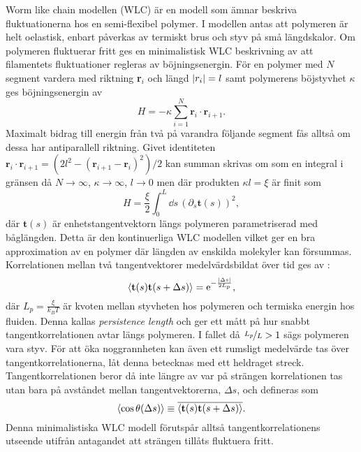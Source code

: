 Worm like chain modellen \cite{Milstein2013} (WLC) är en modell som ämnar beskriva fluktuationerna hos en semi-flexibel polymer. I modellen antas att polymeren är helt oelastisk, enbart påverkas av termiskt brus och styv på små längdskalor. Om polymeren fluktuerar fritt %
ges en minimalistisk WLC beskrivning av att filamentets fluktuationer regleras av böjningsenergin. För en polymer med $N$ segment vardera med riktning \textbf{r}$_i$ och längd $\abs{r_{i}}=l$ samt polymerens böjstyvhet $\kappa$ ges böjningsenergin av
\begin{equation}
    H = -\kappa\sum_{i=1}^{N}\textbf{r}_{i}\cdot \textbf{r}_{i+1}.
\end{equation}
Maximalt bidrag till energin från två på varandra följande segment fås alltså om dessa har antiparallell riktning. Givet identiteten $\textbf{r}_{i}\cdot\textbf{r}_{i+1}=(2l^2-(\textbf{r}_{i+1}-\textbf{r}_{i})^2)/2$ kan summan skrivas om som en integral i gränsen då $N \to \infty$, $\kappa\to\infty$, $l \to 0$ men där produkten $\kappa l=\xi$ är finit som 
\begin{equation}\label{böj}
    H=\frac{\xi}{2}\int_{0}^{L}\!\dd{s}\,(\partial_{s}\textbf{t}(s))^2,
\end{equation}
där $\textbf{t}(s)$ är enhetstangentvektorn längs polymeren parametriserad med båglängden. Detta är den kontinuerliga WLC modellen \cite{Fixman_WLC1973} vilket ger en bra approximation av en polymer där längden av enskilda molekyler kan försummas. Korrelationen mellan två tangentvektorer medelvärdsbildat över tid ges av \cite{Landau1958}:
\begin{equation}
\ev{\textbf{t}(s)\textbf{t}(s+\Delta s)}=\ee^{-\frac{\abs{\Delta s}}{2L_{p}}},
\end{equation}
där $L_{p}=\frac{\xi}{k_{B}T}$ är kvoten mellan styvheten hos polymeren och termiska energin hos fluiden. Denna kallas \emph{persistence length} och ger ett mått på hur snabbt tangentkorrelationen avtar längs polymeren. I fallet då $\nicefrac{L_{p}}{L}>1$ sägs polymeren vara styv. 
För att öka noggrannheten kan även ett rumsligt medelvärde tas över tangentkorrelationerna, låt denna betecknas med ett heldraget streck. Tangentkorrelationen beror då inte längre av var på strängen korrelationen tas utan bara på avståndet mellan tangentvektorerna, $\Delta s$, och defineras som
\begin{equation}
\label{tangkorr}
    \ev{\cos\theta(\Delta s)}\equiv\overline{\ev{\mathbf{t}(s)\mathbf{t}(s+\Delta s)}}.
\end{equation}
Denna minimalistiska WLC modell förutspår alltså tangentkorrelationens utseende utifrån antagandet att strängen tillåts fluktuera fritt.



